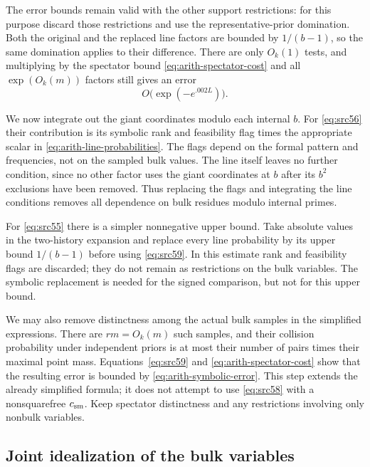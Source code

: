 The error bounds remain valid with the other support restrictions: for this
purpose discard those restrictions and use the representative-prior
domination. Both the original and the replaced line factors are bounded by
$1/(b-1)$, so the same domination applies to their difference. There are only
$O_k(1)$ tests, and multiplying by the spectator bound
\eqref{eq:arith-spectator-cost} and all $\exp(O_k(m))$ factors still gives
an error
\begin{equation}\label{eq:arith-symbolic-error}
                              O\bigl(\exp(-e^{.002L})\bigr).
\end{equation}

We now integrate out the giant coordinates modulo each internal $b$.
For \eqref{eq:src56} their contribution is its symbolic rank and feasibility
flag times the appropriate scalar in \eqref{eq:arith-line-probabilities}.
The flags depend on the formal pattern and frequencies, not on the sampled
bulk values. The line itself leaves no further condition, since no other
factor uses the giant coordinates at $b$ after its $b^2$ exclusions have
been removed. Thus replacing the flags and integrating the line conditions
removes all dependence on bulk residues modulo internal primes.

For \eqref{eq:src55} there is a simpler nonnegative upper bound. Take
absolute values in the two-history expansion and replace every line
probability by its upper bound $1/(b-1)$ before using
\eqref{eq:src59}. In this estimate rank and feasibility flags are discarded;
they do not remain as restrictions on the bulk variables. The symbolic
replacement is needed for the signed comparison, but not for this upper
bound.

We may also remove distinctness among the actual bulk samples in the
simplified expressions. There are $rm=O_k(m)$ such samples, and their
collision probability under independent priors is at most their number of
pairs times their maximal point mass. Equations~\eqref{eq:src59} and
\eqref{eq:arith-spectator-cost} show that the resulting error is bounded by
\eqref{eq:arith-symbolic-error}. This step extends the already simplified
formula; it does not attempt to use \eqref{eq:src58} with a nonsquarefree
$c_{\rm sm}$. Keep spectator distinctness and any restrictions involving
only nonbulk variables.

\subsection{Joint idealization of the bulk variables}

